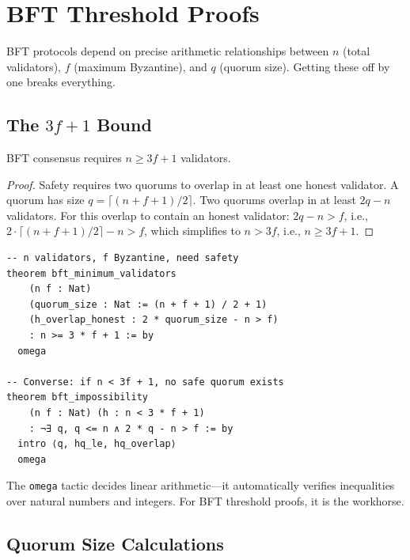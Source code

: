 \section{BFT Threshold Proofs}


BFT protocols depend on precise arithmetic relationships between $n$ (total validators),
$f$ (maximum Byzantine), and $q$ (quorum size). Getting these off by one breaks
everything.

\subsection{The $3f + 1$ Bound}

\begin{theorem}
BFT consensus requires $n \geq 3f + 1$ validators.
\end{theorem}

\begin{proof}
Safety requires two quorums to overlap in at least one honest validator. A quorum has
size $q = \lceil (n + f + 1) / 2 \rceil$. Two quorums overlap in at least $2q - n$
validators. For this overlap to contain an honest validator: $2q - n > f$, i.e.,
$2 \cdot \lceil (n + f + 1) / 2 \rceil - n > f$, which simplifies to $n > 3f$, i.e.,
$n \geq 3f + 1$.
\end{proof}

\begin{lstlisting}[language=Lean,caption={$3f + 1$ bound in Lean~4}]
-- n validators, f Byzantine, need safety
theorem bft_minimum_validators
    (n f : Nat)
    (quorum_size : Nat := (n + f + 1) / 2 + 1)
    (h_overlap_honest : 2 * quorum_size - n > f)
    : n >= 3 * f + 1 := by
  omega

-- Converse: if n < 3f + 1, no safe quorum exists
theorem bft_impossibility
    (n f : Nat) (h : n < 3 * f + 1)
    : ¬∃ q, q <= n ∧ 2 * q - n > f := by
  intro ⟨q, hq_le, hq_overlap⟩
  omega
\end{lstlisting}

The \texttt{omega} tactic decides linear arithmetic---it automatically verifies
inequalities over natural numbers and integers. For BFT threshold proofs, it is the
workhorse.

\subsection{Quorum Size Calculations}

